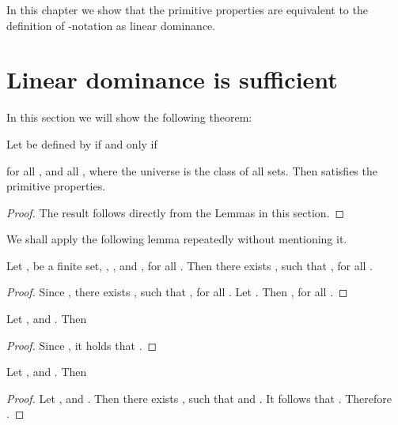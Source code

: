 \documentclass[b5paper, english, oneside]{memoir}
\begin{document}
In this chapter we show that the primitive properties are equivalent to the definition of -notation as linear dominance.

\section{Linear dominance is sufficient}
\label{SufficientDefinition}

In this section we will show the following theorem:

\begin{theorem}
\label{LinearImpliesPrimitive}
Let  be defined by  if and only if

for all , and all , where the universe  is the class of all sets. Then  satisfies the primitive properties.
\end{theorem}

\begin{proof}
The result follows directly from the Lemmas in this section.
\end{proof}

We shall apply the following lemma repeatedly without mentioning it.

\begin{lemma}
\label{LinearSingleConstantLemma}
Let ,  be a finite set, , , and , for all . Then there exists , such that , for all .
\end{lemma}

\begin{proof}
Since , there exists , such that , for all . Let . Then , for all .
\end{proof}

\begin{lemma}
\label{LinearOrderConsistency}
Let , and . Then 

\end{lemma}

\begin{proof}
Since , it holds that .
\end{proof}

\begin{lemma}
\label{LinearTransitivity}
Let , and . Then 

\end{lemma}

\begin{proof}
Let , and . Then there exists , such that  and . It follows that . Therefore .
\end{proof}
\end{document}
